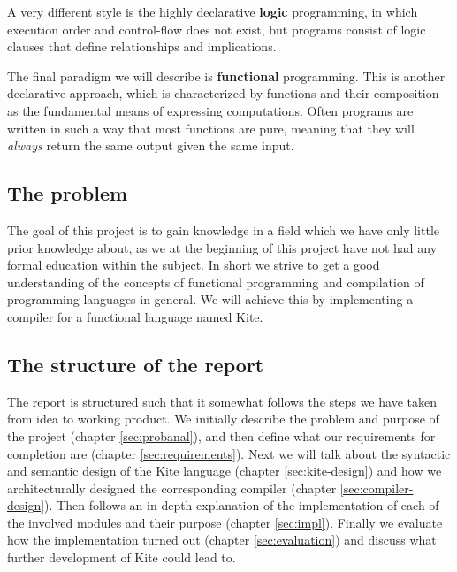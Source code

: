 A very different style is the highly declarative \textbf{logic} programming, in which execution order and control-flow does not exist, but programs consist of logic clauses that define relationships and implications.

The final paradigm we will describe is \textbf{functional} programming. This is another declarative approach, which is characterized by functions and their composition as the fundamental means of expressing computations. Often programs are written in such a way that most functions are pure, meaning that they will \emph{always} return the same output given the same input.

\subsection{The problem}
The goal of this project is to gain knowledge in a field which we have only little prior knowledge about, as we at the beginning of this project have not had any formal education within the subject. In short we strive to get a good understanding of the concepts of functional programming and compilation of programming languages in general. We will achieve this by implementing a compiler for a functional language named Kite.

\subsection{The structure of the report}
The report is structured such that it somewhat follows the steps we have taken from idea to working product. We initially describe the problem and purpose of the project (chapter \ref{sec:probanal}), and then define what our requirements for completion are (chapter \ref{sec:requirements}). Next we will talk about the syntactic and semantic design of the Kite language (chapter \ref{sec:kite-design}) and how we architecturally designed the corresponding compiler (chapter \ref{sec:compiler-design}). Then follows an in-depth explanation of the implementation of each of the involved modules and their purpose (chapter \ref{sec:impl}). Finally we evaluate how the implementation turned out (chapter \ref{sec:evaluation}) and discuss what further development of Kite could lead to.


